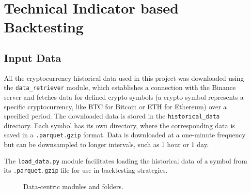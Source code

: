 \chapter{Technical Indicator based Backtesting}
\label{chap:technical_backtesting}


\section{Input Data}

All the cryptocurrency historical data used in this project was downloaded using the \texttt{data\_retriever} module, which establishes a connection with the Binance server
and fetches data for defined crypto symbols (a crypto symbol represents a specific cryptocurrency,
like BTC for Bitcoin or ETH for Ethereum) over a specified period.
The downloaded data is stored in the \texttt{historical\_data} directory. Each symbol has its own directory, where the corresponding data is
saved in a \texttt{.parquet.gzip} format.
Data is downloaded at a one-minute frequency but can be downsampled to longer intervals, such as 1 hour or 1 day.

The \texttt{load\_data.py} module facilitates loading the historical data of a symbol from its \texttt{.parquet.gzip} file for use in backtesting strategies.

\begin{figure}[h]

\caption{Data-centric modules and folders.}\label{fig:inputdata}
\end{figure}

